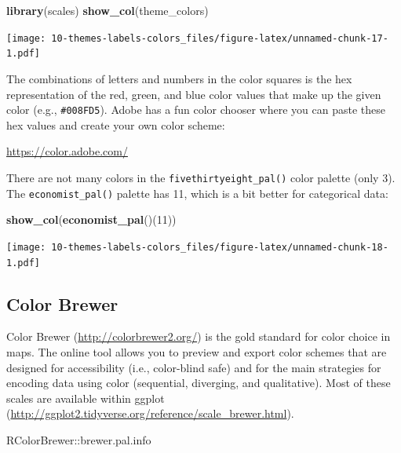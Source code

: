 \documentclass[]{book}
\newenvironment{Shaded}{\begin{snugshade}}{\end{snugshade}}
\newcommand{\KeywordTok}[1]{\textcolor[rgb]{0.13,0.29,0.53}{\textbf{{#1}}}}
\newcommand{\DecValTok}[1]{\textcolor[rgb]{0.00,0.00,0.81}{{#1}}}
\newcommand{\NormalTok}[1]{{#1}}
\theoremstyle{definition}
\theoremstyle{definition}
\theoremstyle{remark}
\begin{document}
\begin{Shaded}
\begin{Highlighting}[]
\KeywordTok{library}\NormalTok{(scales)}
\KeywordTok{show_col}\NormalTok{(theme_colors)}
\end{Highlighting}
\end{Shaded}

\texttt{[image: 10-themes-labels-colors\_files/figure-latex/unnamed-chunk-17-1.pdf]}

The combinations of letters and numbers in the color squares is the hex
representation of the red, green, and blue color values that make up the
given color (e.g., \texttt{\#008FD5}). Adobe has a fun color chooser
where you can paste these hex values and create your own color scheme:

\url{https://color.adobe.com/}

There are not many colors in the \texttt{fivethirtyeight\_pal()} color
palette (only 3). The \texttt{economist\_pal()} palette has 11, which is
a bit better for categorical data:

\begin{Shaded}
\begin{Highlighting}[]
\KeywordTok{show_col}\NormalTok{(}\KeywordTok{economist_pal}\NormalTok{()(}\DecValTok{11}\NormalTok{))}
\end{Highlighting}
\end{Shaded}

\texttt{[image: 10-themes-labels-colors\_files/figure-latex/unnamed-chunk-18-1.pdf]}

\subsection{Color Brewer}\label{color-brewer}

Color Brewer (\url{http://colorbrewer2.org/}) is the gold standard for
color choice in maps. The online tool allows you to preview and export
color schemes that are designed for accessibility (i.e., color-blind
safe) and for the main strategies for encoding data using color
(sequential, diverging, and qualitative). Most of these scales are
available within ggplot
(\url{http://ggplot2.tidyverse.org/reference/scale_brewer.html}).

\begin{Shaded}
\begin{Highlighting}[]
\NormalTok{RColorBrewer::brewer.pal.info}
\end{Highlighting}
\end{Shaded}
\end{document}
